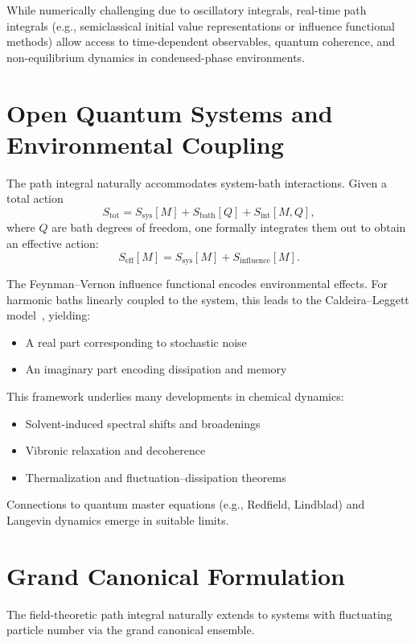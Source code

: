 While numerically challenging due to oscillatory integrals, real-time path integrals (e.g., semiclassical initial value representations or influence functional methods) allow access to time-dependent observables, quantum coherence, and non-equilibrium dynamics in condensed-phase environments.

\section{Open Quantum Systems and Environmental Coupling}
\label{sec:path_integral_open_systems}

The path integral naturally accommodates system-bath interactions. Given a total action
\[
S_{\text{tot}} = S_{\text{sys}}[M] + S_{\text{bath}}[Q] + S_{\text{int}}[M, Q],
\]
where \(Q\) are bath degrees of freedom, one formally integrates them out to obtain an effective action:
\[
S_{\text{eff}}[M] = S_{\text{sys}}[M] + S_{\text{influence}}[M].
\]

The Feynman–Vernon influence functional encodes environmental effects. For harmonic baths linearly coupled to the system, this leads to the Caldeira–Leggett model~\cite{Caldeira1983}, yielding:
\begin{itemize}
	\item A real part corresponding to stochastic noise
	\item An imaginary part encoding dissipation and memory
\end{itemize}

This framework underlies many developments in chemical dynamics:
\begin{itemize}
	\item Solvent-induced spectral shifts and broadenings
	\item Vibronic relaxation and decoherence
	\item Thermalization and fluctuation–dissipation theorems
\end{itemize}

Connections to quantum master equations (e.g., Redfield, Lindblad) and Langevin dynamics emerge in suitable limits.

\section{Grand Canonical Formulation}
\label{sec:path_integral_grand_canonical}

The field-theoretic path integral naturally extends to systems with fluctuating particle number via the grand canonical ensemble.

